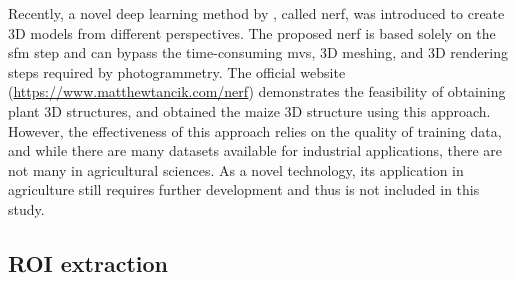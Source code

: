 

Recently, a novel deep learning method by \citet{mildenhall_nerf_2022}, called \gls{nerf}, was introduced to create 3D models from different perspectives. The proposed \gls{nerf} is based solely on the \gls{sfm} step and can bypass the time-consuming \gls{mvs}, 3D meshing, and 3D rendering steps required by photogrammetry. The official website (\url{https://www.matthewtancik.com/nerf}) demonstrates the feasibility of obtaining plant 3D structures, and \citet{jignasu_plant_2023} obtained the maize 3D structure using this approach. However, the effectiveness of this approach relies on the quality of training data, and while there are many datasets available for industrial applications, there are not many in agricultural sciences. As a novel technology, its application in agriculture still requires further development and thus is not included in this study.



\subsection{ROI extraction}


